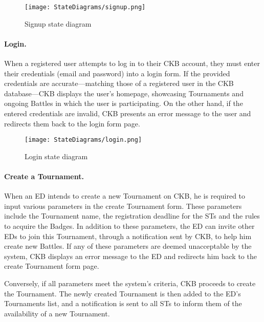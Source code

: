 \begin{figure}[H]
    \begin{center}
        \texttt{[image: StateDiagrams/signup.png]}
        \caption{Signup state diagram}
        \label{fig:signup_sd}%
    \end{center}
\end{figure}

\paragraph{Login.}
When a registered user attempts to log in to their CKB account, they must enter their credentials (email and password) into a login form. If the provided credentials are accurate—matching those of a registered user in the CKB database—CKB displays the user's homepage, showcasing Tournaments and ongoing Battles in which the user is participating. On the other hand, if the entered credentials are invalid, CKB presents an error message to the user and redirects them back to the login form page.

\begin{figure}[H]
    \begin{center}
        \texttt{[image: StateDiagrams/login.png]}
        \caption{Login state diagram}
        \label{fig:login_sd}%
    \end{center}
\end{figure}

\paragraph{Create a Tournament.}
When an ED intends to create a new Tournament on CKB, he is required to input various parameters in the create Tournament form. These parameters include the Tournament name, the registration deadline for the STs and the rules to acquire the Badges. In addition to these parameters, the ED can invite other EDs to join this Tournament, through a notification sent by CKB, to help him create new Battles. If any of these parameters are deemed unacceptable by the system, CKB displays an error message to the ED and redirects him back to the create Tournament form page.

Conversely, if all parameters meet the system's criteria, CKB proceeds to create the Tournament. The newly created Tournament is then added to the ED's Tournaments list, and a notification is sent to all STs to inform them of the availability of a new Tournament.

